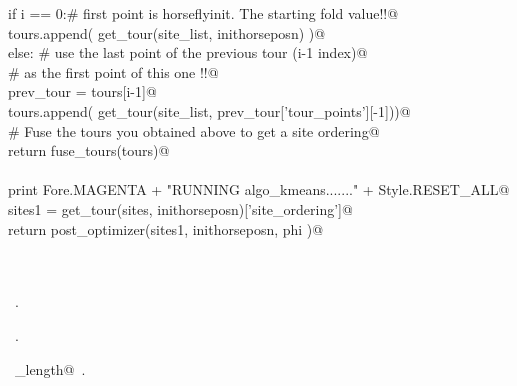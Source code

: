 \documentclass[11.5pt]{report}
\begin{document}
\begin{flushleft}
\begin{list}{}{}
\mbox{}\verb@                 if i == 0:# first point is horseflyinit. The starting fold value!!@\\
\mbox{}\verb@                       tours.append( get_tour(site_list, inithorseposn)  )@\\
\mbox{}\verb@                 else: # use the last point of the previous tour (i-1 index)@\\
\mbox{}\verb@                       # as the first point of this one !!@\\
\mbox{}\verb@                       prev_tour  = tours[i-1]@\\
\mbox{}\verb@                       tours.append( get_tour(site_list, prev_tour['tour_points'][-1]))@\\
\mbox{}\verb@           # Fuse the tours you obtained above to get a site ordering@\\
\mbox{}\verb@           return fuse_tours(tours)@\\
\mbox{}\verb@@\\
\mbox{}\verb@     print Fore.MAGENTA + "RUNNING algo_kmeans......." + Style.RESET_ALL@\\
\mbox{}\verb@     sites1 = get_tour(sites, inithorseposn)['site_ordering']@\\
\mbox{}\verb@     return  post_optimizer(sites1, inithorseposn, phi )@\\
\mbox{}\verb@@\\
\mbox{}\verb@@\\
\mbox{}\verb@@{\NWsep}
\end{list}
\vspace{-1.5ex}
\footnotesize
\begin{list}{}{\setlength{\itemsep}{-\parsep}\setlength{\itemindent}{-\leftmargin}}
\item \NWtxtMacroDefBy\ .
\item \NWtxtMacroRefIn\ .
\item \NWtxtIdentsUsed\nobreak\  \verb@tour_length@\nobreak\ .
\item{}
\end{list}
\vspace{4ex}
\end{flushleft}
\end{document}
